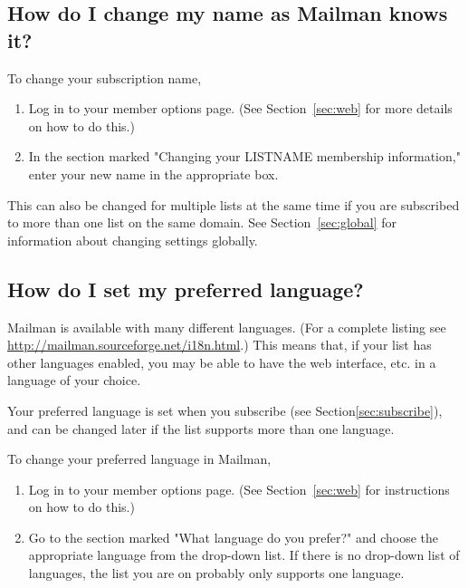\documentclass{howto}
\begin{document}
\subsection{How do I change my name as Mailman knows it?
	\label{sec:changename}}

To change your subscription name, 
\begin{enumerate}
	\item Log in to your member options page.  (See Section~\ref{sec:web} 
	for more details on how to do this.)
	\item In the section marked "Changing your LISTNAME membership information,"
	enter your new name in the appropriate box.
\end{enumerate}

This can also be changed for multiple lists at the same time if you are subscribed to 
more than one list on the same domain.  See Section~\ref{sec:global} for 
information about changing settings globally.


\subsection{How do I set my preferred language?}

Mailman is available with many different languages.
(For a complete listing see \url{http://mailman.sourceforge.net/i18n.html}.)  This means that, if your list has
other languages enabled, you may be able to have the web interface, etc. in a 
language of your choice.  


Your preferred language is set when you subscribe (see 
Section\ref{sec:subscribe}), and can be changed later if the list supports
more than one language.  

To change your preferred language in Mailman,
\begin{enumerate}
	\item Log in to your member options page.  (See Section~\ref{sec:web} for 
   instructions on how to do this.)
	\item Go to the section marked "What language do you prefer?" and choose
	the appropriate language from the drop-down list.  If there is no
	drop-down list of languages, the list you are on probably only supports
	one language.  
\end{enumerate}
\end{document}
